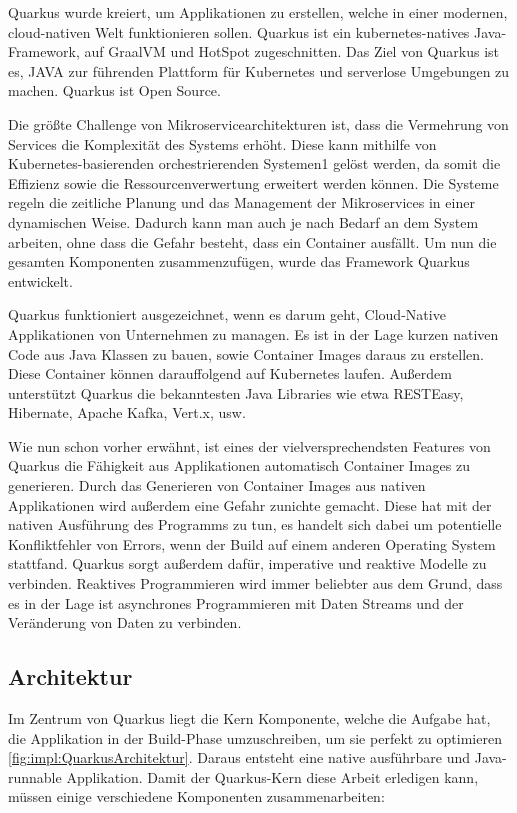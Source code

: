  
Quarkus wurde kreiert, um Applikationen zu erstellen, welche in einer modernen, cloud-nativen Welt funktionieren sollen. Quarkus ist ein kubernetes-natives Java-Framework, auf GraalVM und HotSpot zugeschnitten. Das Ziel von Quarkus ist es, JAVA zur führenden Plattform für Kubernetes und serverlose Umgebungen zu machen. Quarkus ist Open Source. \cite{quarkusOfficialSite}
 
Die größte Challenge von Mikroservicearchitekturen ist, dass die Vermehrung von Services die Komplexität des Systems erhöht. Diese kann mithilfe von Kubernetes-basierenden orchestrierenden Systemen1 gelöst werden, da somit die Effizienz sowie die Ressourcenverwertung erweitert werden können. Die Systeme regeln die zeitliche Planung und das Management der Mikroservices in einer dynamischen Weise. Dadurch kann man auch je nach Bedarf an dem System arbeiten, ohne dass die Gefahr besteht, dass ein Container ausfällt. Um nun die gesamten Komponenten zusammenzufügen, wurde das Framework Quarkus entwickelt.
 
Quarkus funktioniert ausgezeichnet, wenn es darum geht, Cloud-Native Applikationen von Unternehmen zu managen. Es ist in der Lage kurzen nativen Code aus Java Klassen zu bauen, sowie Container Images daraus zu erstellen. Diese Container können darauffolgend auf Kubernetes laufen. Außerdem unterstützt Quarkus die bekanntesten Java Libraries wie etwa RESTEasy, Hibernate, Apache Kafka, Vert.x, usw.
 
Wie nun schon vorher erwähnt, ist eines der vielversprechendsten Features von Quarkus die Fähigkeit aus Applikationen automatisch Container Images zu generieren. Durch das Generieren von Container Images aus nativen Applikationen wird außerdem eine Gefahr zunichte gemacht. Diese hat mit der nativen Ausführung des Programms zu tun, es handelt sich dabei um potentielle Konfliktfehler von Errors, wenn der Build auf einem anderen Operating System stattfand.
Quarkus sorgt außerdem dafür, imperative und reaktive Modelle zu verbinden. Reaktives Programmieren wird immer beliebter aus dem Grund, dass es in der Lage ist asynchrones Programmieren mit Daten Streams und der Veränderung von Daten zu verbinden. \cite{QuarkusBuch}
 
\subsection{Architektur}
Im Zentrum von Quarkus liegt die Kern Komponente, welche die Aufgabe hat, die Applikation in der Build-Phase umzuschreiben, um sie perfekt zu optimieren \ref{fig:impl:QuarkusArchitektur}. Daraus entsteht eine native ausführbare und Java-runnable Applikation. Damit der Quarkus-Kern diese Arbeit erledigen kann, müssen einige verschiedene Komponenten zusammenarbeiten:
 
